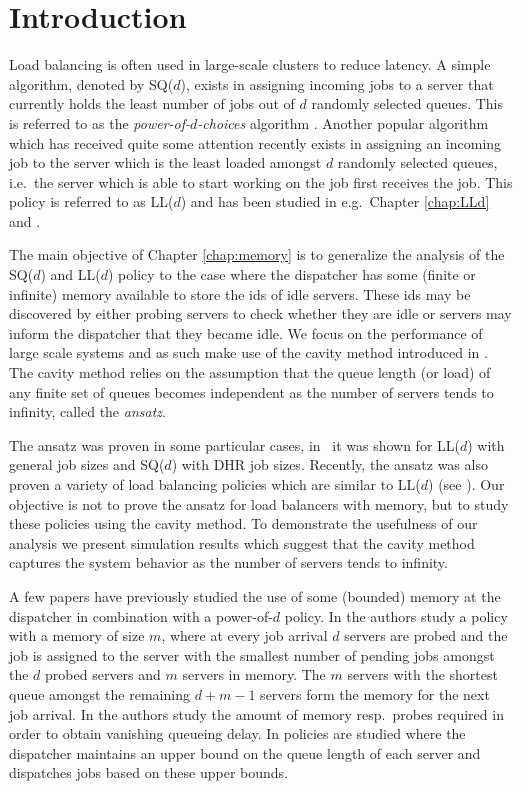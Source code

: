 \documentclass[12pt]{report}
\begin{document}
\section{Introduction}
Load balancing is often used in large-scale clusters to reduce latency. A simple algorithm, denoted by SQ($d$), exists in assigning incoming jobs to a server that currently holds the least number of jobs out of $d$ randomly selected queues. This is referred to as the \textit{power-of-$d$-choices} algorithm \cite{aghajani2017pde, mitzenmacher2, vvedenskaya3}. Another popular algorithm which has received quite some attention recently exists in assigning an incoming job to the server which is the least loaded amongst $d$ randomly selected queues, i.e.~the server which is able to start working on the job first receives the job. This policy is referred to as LL($d$) and has been studied in e.g.~Chapter \ref{chap:LLd} and \cite{bramson2012asymptotic,Sparrow,mitzenmacher2019supermarket}.

The main objective of Chapter \ref{chap:memory} is to generalize the analysis of the SQ($d$) and LL($d$) policy to the case where the dispatcher has some (finite or infinite) memory available to store 
the ids of idle servers. These ids may be discovered by either probing servers to check whether they are idle or servers may inform the dispatcher that they became idle. We focus on the performance
of large scale systems and as such make use of the cavity method introduced in \cite{bramsonLB}. The
cavity method relies on the assumption that the queue length (or load) of any finite set of queues
becomes independent as the number of servers tends to infinity, called the {\it ansatz}. 

The ansatz was proven in some particular cases, in~\cite{bramson2012asymptotic} it was shown for LL($d$) with general job sizes and SQ($d$) with DHR job sizes. Recently, the ansatz was also proven a variety of load balancing policies which are similar to LL($d$) (see \cite{shneer2020large}). Our objective is not to prove the ansatz for load balancers with memory, but to study these policies using the cavity method. To demonstrate the usefulness
of our analysis we present simulation results which suggest that the cavity method captures the system behavior as the number of servers tends to infinity.

A few papers have previously studied the use of some (bounded) memory at the dispatcher in combination with a power-of-$d$ policy. In \cite{mitzenmacher2002load} the authors study a policy with a memory of size $m$, where at every job arrival $d$ servers are probed and the job is assigned to the server with the smallest number of pending jobs amongst the $d$ probed
servers and $m$ servers in memory. The $m$ servers with the shortest queue amongst the remaining $d+m-1$ servers form the memory for the next job arrival. In \cite{gamarnik2020lower} the authors study the amount of memory resp.~probes required in order to obtain vanishing queueing delay. In \cite{van2019hyper, anselmi2020power}  policies are studied where the dispatcher maintains an upper bound on the queue length
of each server and dispatches jobs based on these upper bounds.
\end{document}
